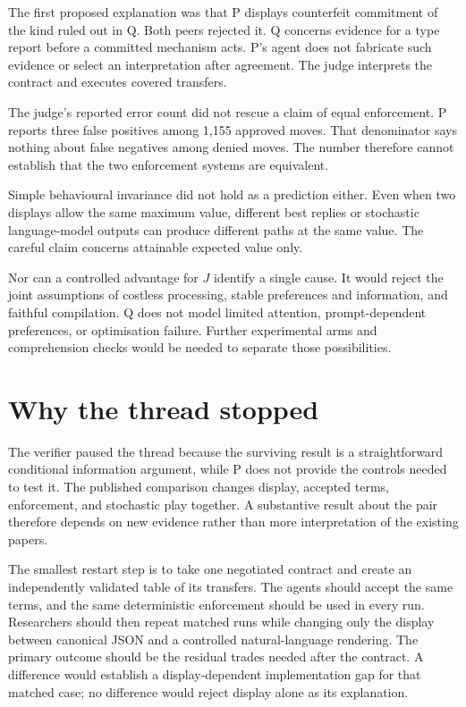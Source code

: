 \documentclass{article}
\begin{document}
The first proposed explanation was that P displays counterfeit commitment of the kind ruled out in Q. Both peers rejected it. Q concerns evidence for a type report before a committed mechanism acts. P's agent does not fabricate such evidence or select an interpretation after agreement. The judge interprets the contract and executes covered transfers.

The judge's reported error count did not rescue a claim of equal enforcement. P reports three false positives among 1,155 approved moves. That denominator says nothing about false negatives among denied moves. The number therefore cannot establish that the two enforcement systems are equivalent.

Simple behavioural invariance did not hold as a prediction either. Even when two displays allow the same maximum value, different best replies or stochastic language-model outputs can produce different paths at the same value. The careful claim concerns attainable expected value only.

Nor can a controlled advantage for $J$ identify a single cause. It would reject the joint assumptions of costless processing, stable preferences and information, and faithful compilation. Q does not model limited attention, prompt-dependent preferences, or optimisation failure. Further experimental arms and comprehension checks would be needed to separate those possibilities.

\section{Why the thread stopped}

The verifier paused the thread because the surviving result is a straightforward conditional information argument, while P does not provide the controls needed to test it. The published comparison changes display, accepted terms, enforcement, and stochastic play together. A substantive result about the pair therefore depends on new evidence rather than more interpretation of the existing papers.

The smallest restart step is to take one negotiated contract and create an independently validated table of its transfers. The agents should accept the same terms, and the same deterministic enforcement should be used in every run. Researchers should then repeat matched runs while changing only the display between canonical JSON and a controlled natural-language rendering. The primary outcome should be the residual trades needed after the contract. A difference would establish a display-dependent implementation gap for that matched case; no difference would reject display alone as its explanation.



\end{document}
